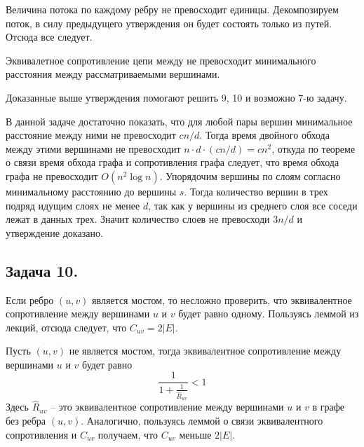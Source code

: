 \documentclass{article}
\begin{document}
Величина потока по каждому ребру не превосходит единицы. Декомпозируем
поток, в силу предыдущего утверждения он будет состоять только из путей.
Отсюда все следует.

Эквивалетное сопротивление цепи между не превосходит минимального расстояния
между рассматриваемыми вершинами.

Доказанные выше утверждения помогают решить 9, 10 и возможно 7-ю задачу.

В данной задаче достаточно показать, что для любой пары вершин минимальное
расстояние между ними не превосходит $c n/d$. Тогда время двойного обхода
между этими вершинами не превосходит $n \cdot d \cdot (c n/d) = c n^2$,
откуда по теореме о связи время обхода графа и сопротивления графа
следует, что время обхода графа не превосходит $O(n^2 \log n)$.
Упорядочим вершины по слоям согласно минимальному расстоянию до вершины $s$.
Тогда количество вершин в трех подряд идущим слоях не менее $d$, так как у
вершины из среднего слоя все соседи лежат в данных трех. Значит количество
слоев не превосходи $3 n / d$ и утверждение доказано.



\subsection*{Задача 10.}
Если ребро $(u,v)$ является мостом, то несложно проверить, что
эквивалентное сопротивление между вершинами $u$ и $v$ будет равно
одному. Пользуясь леммой из лекций, отсюда следует, что $C_{uv} = 2 |E|$.

Пусть $(u, v)$ не является мостом, тогда
эквивалентное сопротивление между вершинами $u$ и $v$ будет равно
$$
    \frac{1}{1 + \frac{1}{\hat{R}_{uv}}} < 1
$$
Здесь $\hat{R}_{uv}$ -- это эквивалентное сопротивление между вершинами
$u$ и $v$ в графе без ребра $(u, v)$. Аналогично, пользуясь леммой о связи
эквивалентного сопротивления и $C_{uv}$ получаем, что $C_{uv}$ меньше $2|E|$.
\end{document}
